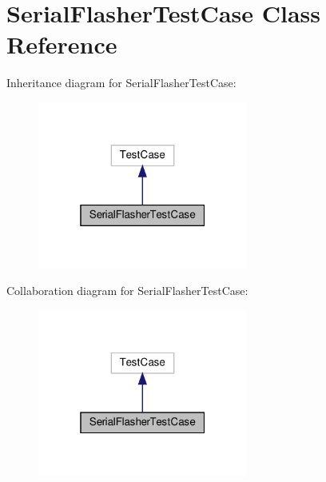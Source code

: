 \hypertarget{classstm__tools_1_1tests_1_1serialflasher__test_1_1SerialFlasherTestCase}{}\section{Serial\+Flasher\+Test\+Case Class Reference}
\label{classstm__tools_1_1tests_1_1serialflasher__test_1_1SerialFlasherTestCase}


Inheritance diagram for Serial\+Flasher\+Test\+Case\+:
\nopagebreak
\begin{figure}[H]
\begin{center}
\leavevmode
\includegraphics[width=196pt]{classstm__tools_1_1tests_1_1serialflasher__test_1_1SerialFlasherTestCase__inherit__graph}
\end{center}
\end{figure}


Collaboration diagram for Serial\+Flasher\+Test\+Case\+:
\nopagebreak
\begin{figure}[H]
\begin{center}
\leavevmode
\includegraphics[width=196pt]{classstm__tools_1_1tests_1_1serialflasher__test_1_1SerialFlasherTestCase__coll__graph}
\end{center}
\end{figure}
